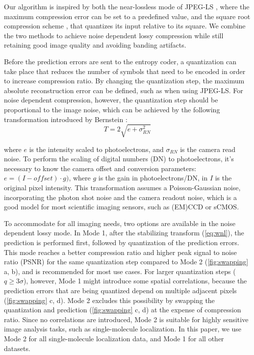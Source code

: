     Our algorithm is inspired by both the near-lossless mode of JPEG-LS \cite{weinberger_loco-i_2000}, where the maximum compression error can be set to a predefined value, and the square root compression scheme \cite{gowen_square_2003, bernstein_noise_2010}, that quantizes its input relative to its square. We combine the two methods to achieve noise dependent lossy compression while still retaining good image quality and avoiding banding artifacts.

    Before the prediction errors are sent to the entropy coder, a quantization can take place that reduces the number of symbols that need to be encoded in order to increase compression ratio. By changing the quantization step, the maximum absolute reconstruction error can be defined, such as when using JPEG-LS. For noise dependent compression, however, the quantization step should be proportional to the image noise, which can be achieved by the following transformation introduced by Bernstein \etal \cite{bernstein_noise_2010}:
    \begin{equation}
      T = 2 \sqrt{e + \sigma^2_{RN}}
      \label{eq:wnl}
    \end{equation}
    
    where $e$ is the intensity scaled to photoelectrons, and $\sigma_{𝑅𝑁}$ is the camera read noise. To perform the scaling of digital numbers (DN) to photoelectrons, it’s necessary to know the camera offset and conversion parameters: $e=(I-offset)\cdot g)$, where $g$ is the gain in photoelectrons/DN, in $I$ is the original pixel intensity. This transformation assumes a Poisson-Gaussian noise, incorporating the photon shot noise and the camera readout noise, which is a good model for most scientific imaging sensors, such as (EM)CCD or sCMOS.

    To accommodate for all imaging needs, two options are available in the noise dependent lossy mode. In Mode 1, after the stabilizing transform (\autoref{eq:wnl}), the prediction is performed first, followed by quantization of the prediction errors. This mode reaches a better compression ratio and higher peak signal to noise ratio (PSNR) for the same quantization step compared to Mode 2 (\autoref{fig:swapping} a, b), and is recommended for most use cases. For larger quantization steps ($q \geq 3 \sigma$), however, Mode 1 might introduce some spatial correlations, because the prediction errors that are being quantized depend on multiple adjacent pixels (\autoref{fig:swapping} c, d). Mode 2 excludes this possibility by swapping the quantization and prediction (\autoref{fig:swapping} c, d) at the expense of compression ratio. Since no correlations are introduced, Mode 2 is suitable for highly sensitive image analysis tasks, such as single-molecule localization. In this paper, we use Mode 2 for all single-molecule localization data, and Mode 1 for all other datasets.
  
